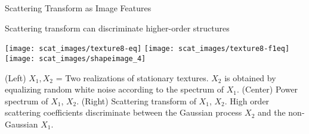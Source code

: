 \begin{frame}{Scattering Transform as Image Features}
\begin{minipage}{0.4\textwidth}
\begin{block}{{\small Scattering transform can discriminate higher-order structures \par}}
\texttt{[image: scat\_images/texture8-eq]}
\texttt{[image: scat\_images/texture8-f1eq]}
\texttt{[image: scat\_images/shapeimage\_4]}\\
{\tiny (Left) $X_1, X_2$ = Two realizations of stationary textures. $X_2$ is obtained by equalizing random white noise according to the spectrum of $X_1$. (Center) Power spectrum of $X_1$, $X_2$. (Right) Scattering transform of $X_1$, $X_2$. High order scattering coefficients discriminate between the Gaussian process $X_2$ and the non-Gaussian $X_1$. \par}
\end{block}

\end{minipage}

\end{frame}

